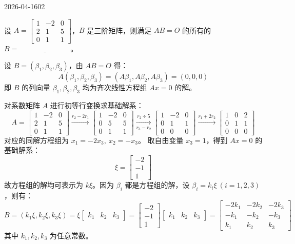 \begin{mistake}{2026-04-16}{02}

\begin{problemcontent}
设 \(A = \begin{bmatrix} 1 & -2 & 0 \\ 2 & 1 & 5 \\ 0 & 1 & 1 \end{bmatrix}\)，\(B\) 是三阶矩阵，则满足 \(AB = O\) 的所有的 \(B = \underline{\hspace{3cm}}\)。
\end{problemcontent}

\begin{solutioncontent}
设 \(B = (\beta_1, \beta_2, \beta_3)\)，由 \(AB = O\) 得：
\[
A(\beta_1, \beta_2, \beta_3) = (A\beta_1, A\beta_2, A\beta_3) = (0, 0, 0)
\]
即 \(B\) 的列向量 \(\beta_1, \beta_2, \beta_3\) 均为齐次线性方程组 \(Ax = 0\) 的解。

对系数矩阵 \(A\) 进行初等行变换求基础解系：
\[
A = \begin{bmatrix} 1 & -2 & 0 \\ 2 & 1 & 5 \\ 0 & 1 & 1 \end{bmatrix}
\xrightarrow{r_2 - 2r_1} \begin{bmatrix} 1 & -2 & 0 \\ 0 & 5 & 5 \\ 0 & 1 & 1 \end{bmatrix}
\xrightarrow[r_3 - r_2]{r_2 \div 5} \begin{bmatrix} 1 & -2 & 0 \\ 0 & 1 & 1 \\ 0 & 0 & 0 \end{bmatrix}
\xrightarrow{r_1 + 2r_2} \begin{bmatrix} 1 & 0 & 2 \\ 0 & 1 & 1 \\ 0 & 0 & 0 \end{bmatrix}
\]
对应的同解方程组为 \(x_1 = -2x_3,\ x_2 = -x_3\)。
取自由变量 \(x_3 = 1\)，得到 \(Ax = 0\) 的基础解系：
\[
\xi = \begin{bmatrix} -2 \\ -1 \\ 1 \end{bmatrix}
\]
故方程组的解均可表示为 \(k\xi\)。因为 \(\beta_i\) 都是方程组的解，设 \(\beta_i = k_i\xi \ (i=1,2,3)\)，则有：
\[
B = (k_1\xi, k_2\xi, k_3\xi) = \xi \begin{bmatrix} k_1 & k_2 & k_3 \end{bmatrix} = \begin{bmatrix} -2 \\ -1 \\ 1 \end{bmatrix} \begin{bmatrix} k_1 & k_2 & k_3 \end{bmatrix} = \begin{bmatrix} -2k_1 & -2k_2 & -2k_3 \\ -k_1 & -k_2 & -k_3 \\ k_1 & k_2 & k_3 \end{bmatrix}
\]
其中 \(k_1, k_2, k_3\) 为任意常数。
\end{solutioncontent}


\end{mistake}
